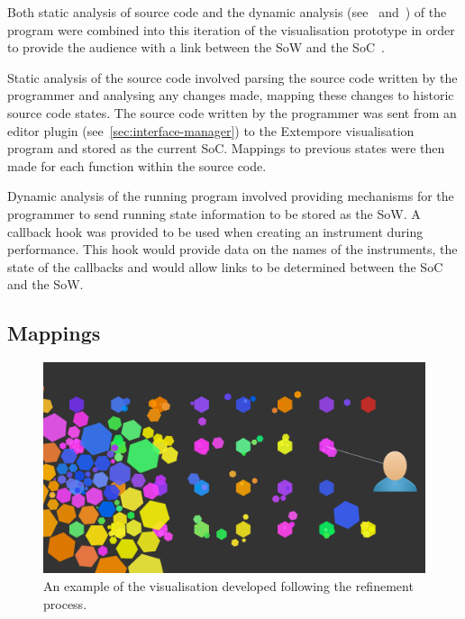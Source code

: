Both static analysis of source code and the dynamic analysis (see~\cite{Eisenbarth2003} and~\cite{Jerding1997}) of the program were combined into this iteration of the visualisation prototype in order to provide the audience with a link between the \acf{SoW} and the \acf{SoC}~\cite{Swift2013}.

Static analysis of the source code involved parsing the source code written by the programmer and analysing any changes made, mapping these changes to historic source code states. The source code written by the programmer was sent from an editor plugin (see~\ref{sec:interface-manager}) to the Extempore visualisation program and stored as the current \ac{SoC}. Mappings to previous states were then made for each function within the source code.

Dynamic analysis of the running program involved providing mechanisms for the programmer to send running state information to be stored as the \ac{SoW}. A callback hook was provided to be used when creating an instrument during performance. This hook would provide data on the names of the instruments, the state of the callbacks and would allow links to be determined between the \ac{SoC} and the \ac{SoW}.

\subsection{Mappings}

\begin{figure}
\centering
\includegraphics[width=\textwidth]{../images/final-visualisations/final-code-visualisation.png}
\caption{An example of the visualisation developed following the refinement process.}
\label{fig:final-visualisation}
\end{figure}

